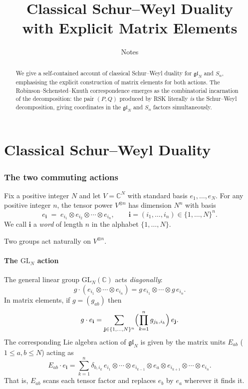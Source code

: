\documentclass[12pt,a4paper]{article}
\title{Classical Schur--Weyl Duality\\with Explicit Matrix Elements}
\author{Notes}
\date{}
\theoremstyle{definition}
\theoremstyle{remark}
\newcommand{\C}{\mathbb{C}}
\newcommand{\gl}{\mathfrak{gl}}
\begin{document}
\maketitle

\begin{abstract}
We give a self-contained account of classical Schur--Weyl duality for
$\gl_N$ and $S_n$, emphasising the explicit construction of matrix elements
for both actions. The Robinson--Schensted--Knuth correspondence emerges
as the combinatorial incarnation of the decomposition: the pair $(P, Q)$
produced by RSK literally \emph{is} the Schur--Weyl decomposition, giving
coordinates in the $\gl_N$ and $S_n$ factors simultaneously.
\end{abstract}

\tableofcontents

\part{Classical Schur--Weyl Duality}

\section{The two commuting actions}
\label{sec:setup}

Fix a positive integer $N$ and let $V = \C^N$ with standard basis
$e_1, \ldots, e_N$. For any positive integer $n$, the tensor power
$V^{\otimes n}$ has dimension $N^n$ with basis
\[
  e_\mathbf{i} \;=\; e_{i_1} \otimes e_{i_2} \otimes \cdots \otimes e_{i_n},
  \qquad \mathbf{i} = (i_1, \ldots, i_n) \in \{1,\ldots,N\}^n.
\]
We call $\mathbf{i}$ a \emph{word} of length $n$ in the alphabet
$\{1, \ldots, N\}$.

Two groups act naturally on $V^{\otimes n}$.

\subsection{The $\mathrm{GL}_N$ action}

The general linear group $\mathrm{GL}_N(\C)$ acts \emph{diagonally}:
\[
  g \cdot (e_{i_1} \otimes \cdots \otimes e_{i_n})
  = g\,e_{i_1} \otimes \cdots \otimes g\,e_{i_n}.
\]
In matrix elements, if $g = (g_{ab})$ then
\[
  g \cdot e_\mathbf{i}
  = \sum_{\mathbf{j} \in \{1,\ldots,N\}^n}
    \Bigl(\prod_{k=1}^{n} g_{j_k, i_k}\Bigr)\, e_\mathbf{j}.
\]
The corresponding Lie algebra action of $\gl_N$ is given by the
matrix units $E_{ab}$ ($1 \leqslant a, b \leqslant N$) acting as
\begin{equation}\label{eq:glN-action}
  E_{ab} \cdot e_\mathbf{i}
  = \sum_{k=1}^{n} \delta_{b, i_k}\,
    e_{i_1} \otimes \cdots \otimes e_{i_{k-1}}
    \otimes e_a
    \otimes e_{i_{k+1}} \otimes \cdots \otimes e_{i_n}.
\end{equation}
That is, $E_{ab}$ scans each tensor factor and replaces $e_b$ by $e_a$
wherever it finds it.
\end{document}
